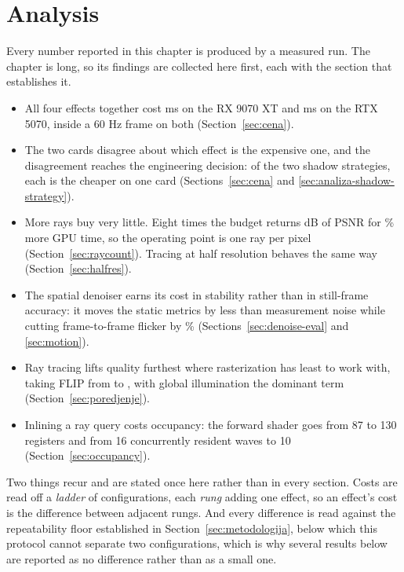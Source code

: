 \chapter{Analysis}
\label{ch:analiza}

Every number reported in this chapter is produced by a measured run. The chapter is long, so its
findings are collected here first, each with the section that establishes it.

\begin{itemize}
\item All four effects together cost \perfFourEffectsAMD{} ms on the RX 9070 XT and
      \perfFourEffectsNV{} ms on the RTX 5070, inside a 60 Hz frame on both
      (Section~\ref{sec:cena}).
\item The two cards disagree about which effect is the expensive one, and the disagreement reaches
      the engineering decision: of the two shadow strategies, each is the cheaper on one card
      (Sections~\ref{sec:cena} and \ref{sec:analiza-shadow-strategy}).
\item More rays buy very little. Eight times the budget returns \rcPsnrGain{} dB of PSNR for
      \rcGpuPct\% more GPU time, so the operating point is one ray per pixel
      (Section~\ref{sec:raycount}). Tracing at half resolution behaves the same way
      (Section~\ref{sec:halfres}).
\item The spatial denoiser earns its cost in stability rather than in still-frame accuracy: it moves
      the static metrics by less than measurement noise while cutting frame-to-frame flicker by
      \flickerPct\% (Sections~\ref{sec:denoise-eval} and \ref{sec:motion}).
\item Ray tracing lifts quality furthest where rasterization has least to work with, taking FLIP from
      \qRasterFlip{} to \qAllRtFlip{}, with global illumination the dominant term
      (Section~\ref{sec:poredjenje}).
\item Inlining a ray query costs occupancy: the forward shader goes from 87 to 130 registers and from
      16 concurrently resident waves to 10 (Section~\ref{sec:occupancy}).
\end{itemize}

Two things recur and are stated once here rather than in every section. Costs are read off a
\emph{ladder} of configurations, each \emph{rung} adding one effect, so an effect's cost is the
difference between adjacent rungs. And every difference is read against the repeatability floor
established in Section~\ref{sec:metodologija}, below which this protocol cannot separate two
configurations, which is why several results below are reported as no difference rather than as a
small one.

